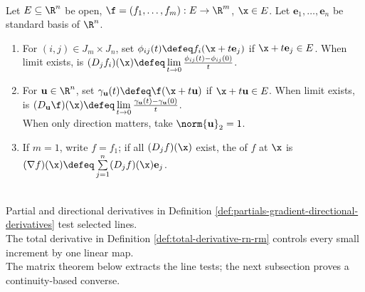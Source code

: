 \begin{definition} \label{def:partials-gradient-directional-derivatives} \\
Let $E\subseteq\R^n$ be open, $\f=(f_1,\ldots,f_m):E\to\R^m$, $\x\in E$. Let $\mathbf e_1,\ldots,\mathbf e_n$ be standard basis of $\R^n$.
\begin{enumerate}[label=(\roman*)]
\setlength{\itemsep}{0pt}
\item For $(i,j)\in J_m\times J_n$, set $\phi_{ij}(t)\defeq f_i(\x+t\mathbf e_j)$ if $\x+t\mathbf e_j\in E$. When limit exists,  is $(D_jf_i)(\x)\defeq\lim\limits_{t\to0}\frac{\phi_{ij}(t)-\phi_{ij}(0)}{t}$.
\item For $\mathbf u\in\R^n$, set $\gamma_{\mathbf u}(t)\defeq\f(\x+t\mathbf u)$ if $\x+t\mathbf u\in E$. When limit exists,  is $(D_{\mathbf u}\f)(\x)\defeq\lim\limits_{t\to0}\frac{\gamma_{\mathbf u}(t)-\gamma_{\mathbf u}(0)}{t}$.\\
When only direction matters, take $\norm{\mathbf{u}}_2=1$.
\item If $m=1$, write $f=f_1$; if all $(D_jf)(\x)$ exist, the  of $f$ at $\x$ is $(\nabla f)(\x)\defeq\sum\limits_{j=1}^{n}(D_jf)(\x)\mathbf{e}_j$.
\end{enumerate}
\end{definition}

\begin{perspective} \label{per:partials-are-coordinate-tests} \\
Partial and directional derivatives in Definition \ref{def:partials-gradient-directional-derivatives} test selected lines.\\
The total derivative in Definition \ref{def:total-derivative-rn-rm} controls every small increment by one linear map.\\
The matrix theorem below extracts the line tests; the next subsection proves a continuity-based converse.
\end{perspective}

